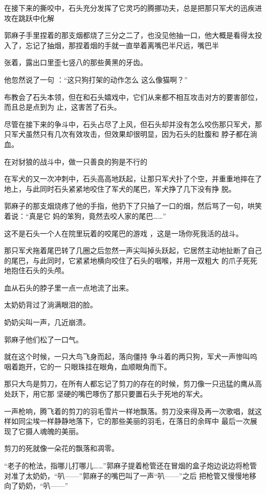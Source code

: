 \documentclass{article}
\begin{document}
在接下来的撕咬中，石头充分发挥了它灵巧的腾挪功夫，总是把那只军犬的迅疾进攻在跳跃中化解

郭麻子手里捏着的那支烟都烧了三分之二了，也没见他抽一口，他大概是看得太投入了，忘记了抽烟，那捏着烟的手就一直举着离嘴巴半尺远，嘴巴半
\newpage

张着，露出口里歪七竖八的那些黄黑的牙齿。 

他忽然说了一句 ：“这只狗打架的动作怎么
这么像猫啊？” 

布教会了石头本领，但在和石头嬉戏中，它们从来都不相互攻击对方的要害部位，而且总是点到为
止，这害苦了石头。 

尽管在接下来的争斗中，石头占尽了上风，但石头却并没有怎么咬伤那只军犬，那只军犬虽然只有几次有效攻击，但效果却很明显，因为石头的肚腹和
脖子都在淌血。 

在对豺狼的战斗中，做一只善良的狗是不行的

在军犬的又一次冲刺中，石头高高地跃起，让那只军犬扑了个空，并重重地摔在了地上，与此同时石头紧紧地咬住了军犬的尾巴，军犬挣了几下没有挣
脱。 

\newpage

郭麻子的那支烟烧疼了他的手指，他扔下了只抽了一口的烟，然后骂了一句，哄笑着说：“真是它
妈的笨狗，竟然去咬人家的尾巴……” 

这不是石头一个人在院里玩着的咬尾巴的游戏
，这是一场你死我活的战斗。 

那只军犬拖着尾巴转了几圈之后忽然一声尖叫掉头跃起，它居然主动地扯断了自己的尾巴，与此同时，它紧紧地横向咬住了石头的咽喉，并用一双粗大
的爪子死死地抱住石头的头颅。 


血从石头的脖子里一点一点地流了出来。 


太奶奶背过了淌满眼泪的脸。 


奶奶尖叫一声，几近崩溃。 


郭麻子他们松了一口气。 

就在这个时候，一只大鸟飞身而起，落向僵持
\newpage
争斗着的两只狗，军犬一声惨叫呜咽着跑开，它的一
只眼珠挂在眼角，血顺眼角而下。 

那只大鸟是剪刀，在所有人都忘记了剪刀的存在的时候，剪刀像一只迅猛的鹰从高处跃下，用它那
坚硬的嘴巴啄伤了那只要置石头于死地的军犬。 

一声枪响，腾飞着的剪刀的羽毛雪片一样地飘落。剪刀没来得及再一次歌唱，就这样如同尘埃一样静静地落下，它的那些美丽的羽毛，在落日的余晖中
最后一次展现了它摄人魂魄的美丽。 


剪刀的死就像一朵花的飘落和凋零。 

“老子的枪法，指哪儿打哪儿……”郭麻子提着枪管还在冒烟的盒子炮边说边将枪管对准了太奶奶，“叭——”郭麻子的嘴巴叫了一声“叭——”之后
把枪管又慢慢地移向了奶奶，“叭——” 
\end{document}
